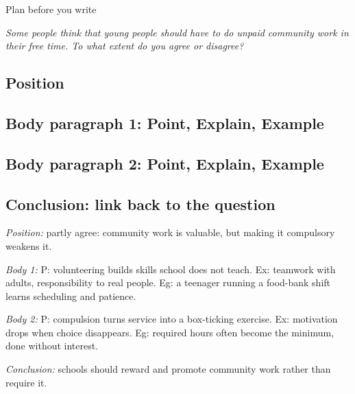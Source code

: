 \documentclass{tutordesk}
\begin{document}
\begin{exercise}[tag=IELTS Writing Task 2]{Plan before you write}

\noindent\emph{Some people think that young people should have to do unpaid community work in
their free time. To what extent do you agree or disagree?}

\subsection{Position}
\subsection{Body paragraph 1: Point, Explain, Example}
\subsection{Body paragraph 2: Point, Explain, Example}
\subsection{Conclusion: link back to the question}
\begin{solution}[Plan]
\emph{Position:} partly agree: community work is valuable, but making it compulsory weakens it.\par
\emph{Body 1:} P: volunteering builds skills school does not teach. Ex: teamwork with adults, responsibility to real people. Eg: a teenager running a food-bank shift learns scheduling and patience.\par
\emph{Body 2:} P: compulsion turns service into a box-ticking exercise. Ex: motivation drops when choice disappears. Eg: required hours often become the minimum, done without interest.\par
\emph{Conclusion:} schools should reward and promote community work rather than require it.
\end{solution}
\end{exercise}

\printanswers
\end{document}
